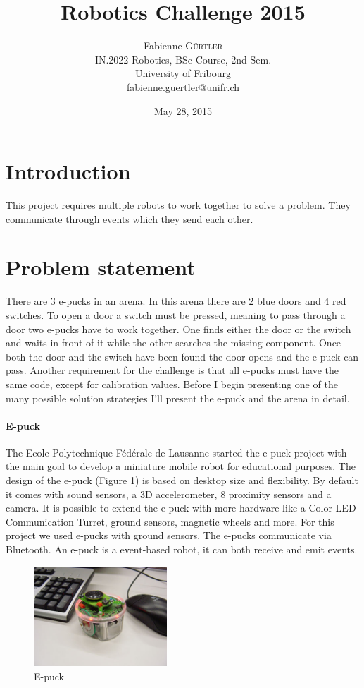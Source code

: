 \documentclass[12pt,a4paper]{article}
\title{Robotics Challenge 2015}
\date{May 28, 2015}
\author{
	Fabienne \textsc{Gürtler}\\
	IN.2022 Robotics, BSc Course, 2nd Sem.\\
	University of Fribourg \\
	\href{mailto:fabienne.guertler@unifr.ch}{fabienne.guertler@unifr.ch}
}
\begin{document}
\maketitle

\section*{Introduction}
This project requires multiple robots to work together to solve a problem. They communicate through events which they send each other.

\section{Problem statement}
There are 3 e-pucks in an arena. In this arena there are 2 blue doors and 4 red switches. To open a door a switch must be pressed, meaning to pass through a door two e-pucks have to work together. One finds either the door or the switch and waits in front of it while the other searches the missing component. Once both the door and the switch have been found the door opens and the e-puck can pass. Another requirement for the challenge is that all e-pucks must have the same code, except for calibration values. Before I begin presenting one of the many possible solution strategies I'll present the e-puck and the arena in detail.

\paragraph{E-puck}
The Ecole Polytechnique Fédérale de Lausanne started the e-puck project with the main goal to develop a miniature mobile robot for educational purposes. The design of the e-puck (Figure \ref{fig:epuck}) is based on desktop size and flexibility. By default it comes with sound sensors, a 3D accelerometer, 8 proximity sensors and a camera. It is possible to extend the e-puck with more hardware like a Color LED Communication Turret, ground sensors, magnetic wheels and more. For this project we used e-pucks with ground sensors. The e-pucks communicate via Bluetooth. An e-puck is a event-based robot, it can both receive and emit events.

\begin{figure}[h!]
\begin{center}
\includegraphics[width = 5cm]{images/epuck-look.jpg}
\caption{E-puck}
\label{fig:epuck}
\end{center}
\end{figure} 
\end{document}
